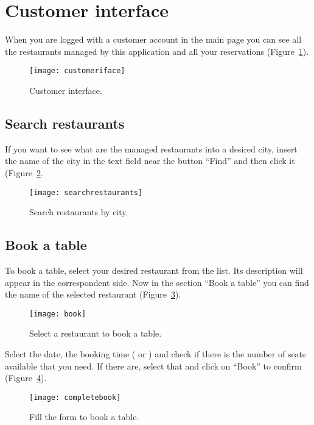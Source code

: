 \section{Customer interface}

When you are logged with a customer account in the main page you can see all the
restaurants managed by this application and all your reservations
(Figure~\ref{fig:customeriface}).

\begin{figure}[!ht]
	\texttt{[image: customeriface]}
	\caption{Customer interface.}
	\label{fig:customeriface}
\end{figure}

\subsection{Search restaurants}

If you want to see what are the managed restaurants into a desired city, insert
the name of the city in the text field near the button ``Find'' and then click
it (Figure~\ref{fig:searchrestaurants}.

\begin{figure}[ht]
	\texttt{[image: searchrestaurants]}
	\caption{Search restaurants by city.}
	\label{fig:searchrestaurants}
\end{figure}

\subsection{Book a table}

To book a table, select your desired restaurant from the list. Its description
will appear in the correspondent side. Now in the section ``Book a table'' you
can find the name of the selected restaurant (Figure~\ref{fig:book}).

\begin{figure}[!ht]
	\texttt{[image: book]}
	\caption{Select a restaurant to book a table.}
	\label{fig:book}
\end{figure}

Select the date, the booking time ( or ) and check if
there is the number of seats available that you need. If there are, select that
and click on ``Book'' to confirm (Figure~\ref{fig:completebook}).

\begin{figure}[ht]
	\texttt{[image: completebook]}
	\caption{Fill the form to book a table.}
	\label{fig:completebook}
\end{figure}

